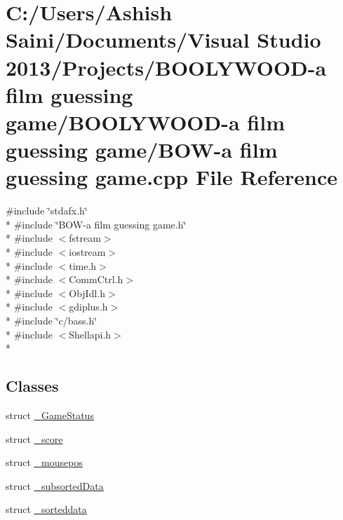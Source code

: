 \hypertarget{_b_o_w-a_01film_01guessing_01game_8cpp}{}\section{C\+:/\+Users/\+Ashish Saini/\+Documents/\+Visual Studio 2013/\+Projects/\+B\+O\+O\+L\+Y\+W\+O\+O\+D-\/a film guessing game/\+B\+O\+O\+L\+Y\+W\+O\+O\+D-\/a film guessing game/\+B\+O\+W-\/a film guessing game.\+cpp File Reference}
\label{_b_o_w-a_01film_01guessing_01game_8cpp}
{\ttfamily \#include \char`\"{}stdafx.\+h\char`\"{}}\\*
{\ttfamily \#include \char`\"{}B\+O\+W-\/a film guessing game.\+h\char`\"{}}\\*
{\ttfamily \#include $<$fstream$>$}\\*
{\ttfamily \#include $<$iostream$>$}\\*
{\ttfamily \#include $<$time.\+h$>$}\\*
{\ttfamily \#include $<$Comm\+Ctrl.\+h$>$}\\*
{\ttfamily \#include $<$Obj\+Idl.\+h$>$}\\*
{\ttfamily \#include $<$gdiplus.\+h$>$}\\*
{\ttfamily \#include \char`\"{}c/bass.\+h\char`\"{}}\\*
{\ttfamily \#include $<$Shellapi.\+h$>$}\\*
\subsection*{Classes}
\begin{DoxyCompactItemize}
\item 
struct \hyperlink{struct___game_status}{\+\_\+\+Game\+Status}
\item 
struct \hyperlink{struct__score}{\+\_\+score}
\item 
struct \hyperlink{struct__mousepos}{\+\_\+mousepos}
\item 
struct \hyperlink{struct__subsorted_data}{\+\_\+subsorted\+Data}
\item 
struct \hyperlink{struct__sorteddata}{\+\_\+sorteddata}
\end{DoxyCompactItemize}
